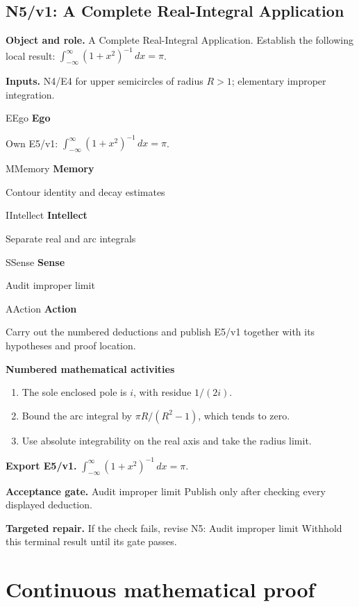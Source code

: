 \documentclass[preprint,12pt,aps,pra,showkeys,amsmath,amssymb,superscriptaddress,floatfix]{revtex4-2}
\theoremstyle{definition}
\theoremstyle{remark}
\newcommand{\mmfaculty}[3]{%
 \begin{mmfacultybox}{#1}{#2}
 {\sffamily\bfseries\color{MMBlue}#2}\par\smallskip #3
 \end{mmfacultybox}}
\newcommand{\field}[2]{\par\smallskip\noindent\textbf{#1.} #2\par}
\begin{document}
\subsection{N5/v1: A Complete Real-Integral Application}

\field{Object and role}{A Complete Real-Integral Application. Establish the following local
result: \(\int_{-\infty}^{\infty}(1+x^2)^{-1}\,dx=\pi\).}

\field{Inputs}{N4/E4 for upper semicircles of radius \(R>1\); elementary improper
integration.}

\mmfaculty{E}{Ego}{Own E5/v1: \(\int_{-\infty}^{\infty}(1+x^2)^{-1}\,dx=\pi\).}

\mmfaculty{M}{Memory}{Contour identity and decay estimates}

\mmfaculty{I}{Intellect}{Separate real and arc integrals}

\mmfaculty{S}{Sense}{Audit improper limit}

\mmfaculty{A}{Action}{Carry out the numbered deductions and publish E5/v1 together with its
hypotheses and proof location.}

\smallskip\noindent\textbf{Numbered mathematical activities}

\begin{enumerate}[label=N5.\arabic*,leftmargin=3.4em]

\item The sole enclosed pole is \(i\), with residue \(1/(2i)\).

\item Bound the arc integral by \(\pi R/(R^2-1)\), which tends to zero.

\item Use absolute integrability on the real axis and take the radius limit.

\end{enumerate}

\field{Export E5/v1}{\(\int_{-\infty}^{\infty}(1+x^2)^{-1}\,dx=\pi\).}

\field{Acceptance gate}{Audit improper limit Publish only after checking every displayed
deduction.}

\field{Targeted repair}{If the check fails, revise N5: Audit improper limit Withhold this
terminal result until its gate passes.}

\endgroup\clearpage\section{Continuous mathematical proof}\label{sec:proof}
\end{document}
